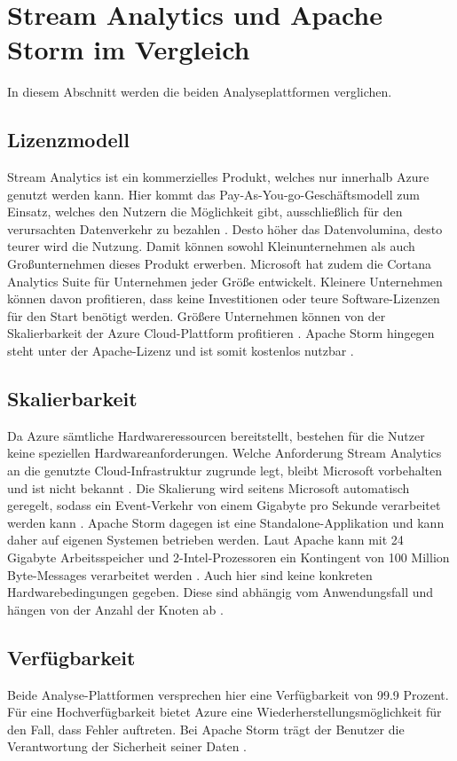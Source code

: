 \section{Stream Analytics und Apache Storm im Vergleich}
In diesem Abschnitt werden die beiden Analyseplattformen verglichen. 


\subsection{Lizenzmodell}
Stream Analytics ist ein kommerzielles Produkt, welches nur innerhalb Azure genutzt werden kann. Hier kommt das Pay-As-You-go-Geschäftsmodell zum Einsatz, welches den Nutzern die Möglichkeit gibt, ausschließlich für den verursachten Datenverkehr zu bezahlen \cite{Pricing.2017}. Desto höher das Datenvolumina, desto teurer wird die Nutzung. Damit können sowohl Kleinunternehmen als auch Großunternehmen dieses Produkt erwerben. Microsoft hat zudem die Cortana Analytics Suite für Unternehmen jeder Größe entwickelt. Kleinere Unternehmen können davon profitieren, dass keine Investitionen oder teure Software-Lizenzen für den Start benötigt werden. Größere Unternehmen können von der Skalierbarkeit der Azure Cloud-Plattform profitieren \cite{Azure.2017}. Apache Storm hingegen steht unter der Apache-Lizenz und ist somit kostenlos nutzbar \cite{lizenz.2004}. 

\subsection{Skalierbarkeit}
Da Azure sämtliche Hardwareressourcen bereitstellt, bestehen für die Nutzer keine speziellen Hardwareanforderungen. Welche Anforderung Stream Analytics an die genutzte Cloud-Infrastruktur zugrunde legt, bleibt Microsoft vorbehalten und ist nicht bekannt \cite{samacha.2017}. Die Skalierung wird seitens Microsoft automatisch geregelt, sodass ein Event-Verkehr von einem Gigabyte pro Sekunde verarbeitet werden kann \cite{samacha.19.12.2017b}. Apache Storm dagegen ist eine Standalone-Applikation und kann daher auf eigenen Systemen betrieben werden. Laut Apache kann mit 24 Gigabyte Arbeitsspeicher und 2-Intel-Prozessoren ein Kontingent von 100 Million Byte-Messages verarbeitet werden \cite{apachescale.2017}. Auch hier sind keine konkreten Hardwarebedingungen gegeben. Diese sind abhängig vom Anwendungsfall und hängen von der Anzahl der Knoten ab \cite{samacha.2017}.

\subsection{Verfügbarkeit}
Beide Analyse-Plattformen versprechen hier eine Verfügbarkeit von 99.9 Prozent. Für eine Hochverfügbarkeit bietet Azure eine Wiederherstellungsmöglichkeit für den Fall, dass Fehler auftreten. Bei Apache Storm  trägt der Benutzer die Verantwortung der Sicherheit seiner Daten \cite{samacha.2017} \cite{apachescale.2017}. 


